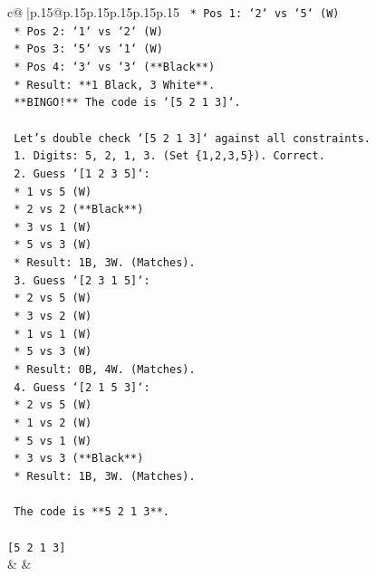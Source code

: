 \documentclass{article}
\begin{document}
{\begin{supertabular}{c@{$\;$}|p{.15\linewidth}@{}p{.15\linewidth}p{.15\linewidth}p{.15\linewidth}p{.15\linewidth}p{.15\linewidth}}
{{{\texttt{            *   Pos 1: `2` vs `5` (W)} \\
\texttt{            *   Pos 2: `1` vs `2` (W)} \\
\texttt{            *   Pos 3: `5` vs `1` (W)} \\
\texttt{            *   Pos 4: `3` vs `3` (**Black**)} \\
\texttt{            *   Result: **1 Black, 3 White**.} \\
\texttt{    **BINGO!** The code is `{[}5 2 1 3{]}`.} \\
\\ 
\texttt{    Let's double check `{[}5 2 1 3{]}` against all constraints.} \\
\texttt{    1.  Digits: 5, 2, 1, 3. (Set \{1,2,3,5\}). Correct.} \\
\texttt{    2.  Guess `{[}1 2 3 5{]}`:} \\
\texttt{        *   1 vs 5 (W)} \\
\texttt{        *   2 vs 2 (**Black**)} \\
\texttt{        *   3 vs 1 (W)} \\
\texttt{        *   5 vs 3 (W)} \\
\texttt{        *   Result: 1B, 3W. (Matches).} \\
\texttt{    3.  Guess `{[}2 3 1 5{]}`:} \\
\texttt{        *   2 vs 5 (W)} \\
\texttt{        *   3 vs 2 (W)} \\
\texttt{        *   1 vs 1 (W)} \\
\texttt{        *   5 vs 3 (W)} \\
\texttt{        *   Result: 0B, 4W. (Matches).} \\
\texttt{    4.  Guess `{[}2 1 5 3{]}`:} \\
\texttt{        *   2 vs 5 (W)} \\
\texttt{        *   1 vs 2 (W)} \\
\texttt{        *   5 vs 1 (W)} \\
\texttt{        *   3 vs 3 (**Black**)} \\
\texttt{        *   Result: 1B, 3W. (Matches).} \\
\\ 
\texttt{    The code is **5 2 1 3**.} \\
\\ 
\texttt{{[}5 2 1 3{]}} \\
            }
        }
    }
    & & \\ \\


\end{supertabular}}
\end{document}
